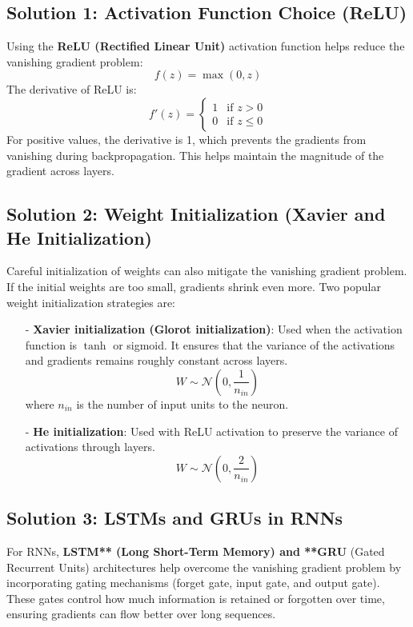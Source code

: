 \documentclass[10pt]{article}
\begin{document}
\subsection{ Solution 1: Activation Function Choice (ReLU)}
Using the {\bf ReLU (Rectified Linear Unit)} activation function helps reduce the vanishing gradient problem:
\[
f(z) = \max(0, z)
\]
The derivative of ReLU is:
\[
f'(z) = \begin{cases} 
1 & \text{if } z > 0 \\
0 & \text{if } z \leq 0
\end{cases}
\]
For positive values, the derivative is 1, which prevents the gradients from vanishing during backpropagation. This helps maintain the magnitude of the gradient across layers.

\subsection{ Solution 2: Weight Initialization (Xavier and He Initialization)}
Careful initialization of weights can also mitigate the vanishing gradient problem. If the initial weights are too small, gradients shrink even more. Two popular weight initialization strategies are:

\begin{itemize}
   \item [-] {\bf Xavier initialization (Glorot initialization)}: Used when the activation function is \( \tanh \) or sigmoid. It ensures that the variance of the activations and gradients remains roughly constant across layers.
     \[
     W \sim \mathcal{N}(0, \frac{1}{n_{in}})
     \]
     where \(n_{in}\) is the number of input units to the neuron.
   
   \item [-] {\bf He initialization}: Used with ReLU activation to preserve the variance of activations through layers.
     \[
     W \sim \mathcal{N}(0, \frac{2}{n_{in}})
     \]
     
\end{itemize}
\subsection{ Solution 3: LSTMs and GRUs in RNNs}
For RNNs, {\bf LSTM** (Long Short-Term Memory) and **GRU} (Gated Recurrent Units) architectures help overcome the vanishing gradient problem by incorporating gating mechanisms (forget gate, input gate, and output gate). These gates control how much information is retained or forgotten over time, ensuring gradients can flow better over long sequences.
\end{document}
